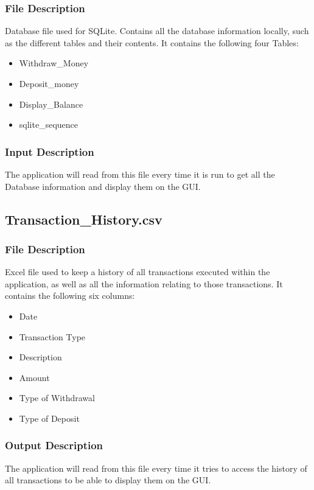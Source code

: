 \documentclass[12pt]{article}
\begin{document}
\subsubsection{File Description}
Database file used for SQLite. Contains all the database information locally, such as the different tables and their contents. It contains the following four Tables:
\begin{itemize}
  \item Withdraw\_Money
  \item Deposit\_money
  \item Display\_Balance
  \item sqlite\_sequence
\end{itemize}

\subsubsection{Input Description}
The application will read from this file every time it is run to get all the Database information and display them on the GUI.

\subsection{Transaction\_History.csv}

\subsubsection{File Description}
Excel file used to keep a history of all transactions executed within the application, as well as all the information relating to those transactions. It contains the following six columns:
\begin{itemize}
  \item Date
  \item Transaction Type
  \item Description
  \item Amount
  \item Type of Withdrawal
  \item Type of Deposit
\end{itemize}

\subsubsection{Output Description}
The application will read from this file every time it tries to access the history of all transactions to be able to display them on the GUI.
\end{document}
